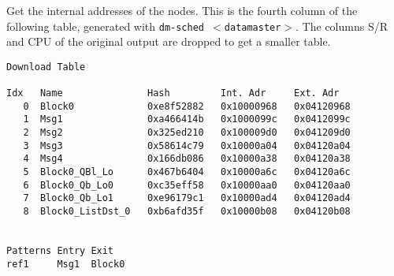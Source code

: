 \documentclass[12pt,a4paper]{report}
\begin{document}
Get the internal addresses of the nodes. This is the fourth column of the
following table, generated with \texttt{dm-sched $<$datamaster$>$}.
The columns S/R and CPU of the original output are dropped to get a smaller table.
\begin{verbatim}
Download Table

Idx   Name               Hash         Int. Adr     Ext. Adr
   0  Block0             0xe8f52882   0x10000968   0x04120968
   1  Msg1               0xa466414b   0x1000099c   0x0412099c
   2  Msg2               0x325ed210   0x100009d0   0x041209d0
   3  Msg3               0x58614c79   0x10000a04   0x04120a04
   4  Msg4               0x166db086   0x10000a38   0x04120a38
   5  Block0_QBl_Lo      0x467b6404   0x10000a6c   0x04120a6c
   6  Block0_Qb_Lo0      0xc35eff58   0x10000aa0   0x04120aa0
   7  Block0_Qb_Lo1      0xe96179c1   0x10000ad4   0x04120ad4
   8  Block0_ListDst_0   0xb6afd35f   0x10000b08   0x04120b08


Patterns Entry Exit
ref1     Msg1  Block0
\end{verbatim}
\end{document}
